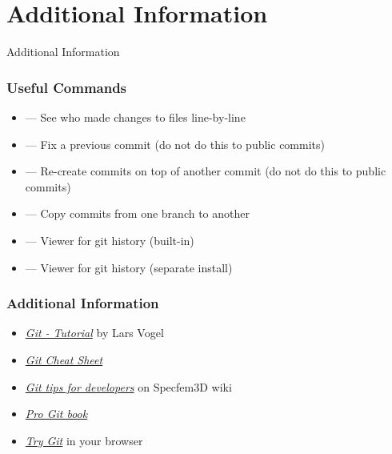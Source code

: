 \section{Additional Information}

\begin{frame}
 \vfill
 \begin{center}
  \LARGE \color{solarizedAccent} Additional Information
 \end{center}
 \vfill
\end{frame}

\begin{frame}
 \frametitle{Useful Commands}

 \begin{itemize}
  \item \texttt{} --- See who made changes to files
        line-by-line
  \item \texttt{} --- Fix a previous commit (do
not        do this to public commits)
  \item \texttt{} --- Re-create commits
        on top of another commit (do not do this to public commits)
  \item \texttt{} --- Copy commits from one branch to
        another
  \item \texttt{} --- Viewer for git history (built-in)
  \item \texttt{} --- Viewer for git history (separate install)
 \end{itemize}
\end{frame}

\begin{frame}
 \frametitle{Additional Information}

 \begin{itemize}
  \item \href{http://www.vogella.com/tutorials/Git/article.html}%
             {\textit{Git - Tutorial}}
   by Lars Vogel
  \item \href{http://www.git-tower.com/blog/git-cheat-sheet/}%
             {\textit{Git Cheat Sheet}}
  \item
   \href{https://github.com/geodynamics/specfem3d/wiki/Git-tips-for-developers}%
        {\textit{Git tips for developers}}
   on Specfem3D wiki
  \item \href{http://git-scm.com/book}{\textit{Pro Git book}}
  \item \href{https://try.github.io/levels/1/challenges/1}{\textit{Try Git}}
   in your browser
 \end{itemize}
\end{frame}

